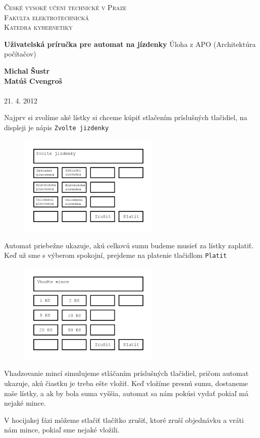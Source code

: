 \documentclass[pdftex,12pt,a4paper]{article}
\def \nazovUlohy{Uživatelská príručka pre automat na jízdenky}
\def \tema{Úloha z APO (Architektúra počítačov)}
\def \author{\textbf{Michal Šustr} \\ \textbf{Matúš Cvengroš}}
\def \date{21. 4. 2012}
\begin{document}
\begin{center}
	\parbox[s][4cm][s]{10cm}{\scshape \large
	České vysoké učení technické v Praze\\Fakulta elektrotechnická\\Katedra kybernetiky}
	\vskip 2cm {\Huge \bfseries \nazovUlohy}
	\vskip 1cm {\Large \tema}
\end{center}

\vfill

\begin{flushright}
	\author \\
	~\\
	\date
\end{flushright}


\newpage
\pagestyle{fancy}

Najprv si zvolíme aké lístky si chceme kúpiť stlačením príslušných tlačidiel, na displeji je nápis \texttt{Zvolte jizdenky}
\begin{figure}[htb]
	\begin{center}
		\leavevmode
		\includegraphics[width=0.6\textwidth]{zvolte-jizdenky.png}
	\end{center}
\end{figure}

Automat priebežne ukazuje, akú celkovú sumu budeme musieť za lístky zaplatiť. Keď už sme s výberom spokojní, prejdeme na platenie tlačidlom \texttt{Platit}
\begin{figure}[htb]
	\begin{center}
		\leavevmode
		\includegraphics[width=0.6\textwidth]{vhodte-mince.png}
	\end{center}
\end{figure}

Vhadzovanie mincí simulujeme stláčaním príslušných tlačidiel, pričom automat ukazuje, akú čiastku je treba ešte vložiť. Keď vložíme presnú sumu, dostaneme naše lístky, a ak by bola suma vyššia, automat sa nám pokúsi vydať pokiaľ má nejaké mince.

V hocijakej fázi môžeme stlačiť tlačítko zrušiť, ktoré zruší objednávku a vráti nám mince, pokiaľ sme nejaké vložili.
\end{document}
